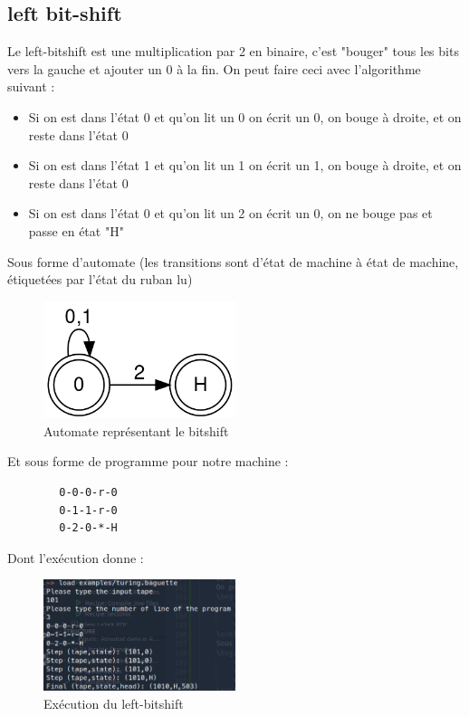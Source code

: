 \documentclass[11pt,colorlinks=true,a4paper]{article}
\begin{document}
    \subsection{left bit-shift}
    Le left-bitshift est une multiplication par 2 en binaire, c'est "bouger" tous les bits vers la gauche et ajouter un 0 à la fin.
    On peut faire ceci avec l'algorithme suivant :
    \begin{itemize}
        \item Si on est dans l'état 0 et qu'on lit un 0 on écrit un 0, on bouge à droite, et on reste dans l'état 0
        \item Si on est dans l'état 1 et qu'on lit un 1 on écrit un 1, on bouge à droite, et on reste dans l'état 0
        \item Si on est dans l'état 0 et qu'on lit un 2 on écrit un 0, on ne bouge pas et passe en état "H"
    \end{itemize}
    Sous forme d'automate (les transitions sont d'état de machine à état de machine, étiquetées par l'état du ruban lu)
    \begin{figure}[H]
        \center 
        \includegraphics[width=0.5\textwidth]{img/automata1.png}
        \caption{Automate représentant le bitshift}
    \end{figure}
    Et sous forme de programme pour notre machine :
    \begin{lstlisting}
        0-0-0-r-0
        0-1-1-r-0
        0-2-0-*-H
    \end{lstlisting}
    Dont l'exécution donne :
    \begin{figure}[H]
        \center 
        \includegraphics[width=0.5\textwidth]{img/bitshift.png}
        \caption{Exécution du left-bitshift}
    \end{figure}
\end{document}
